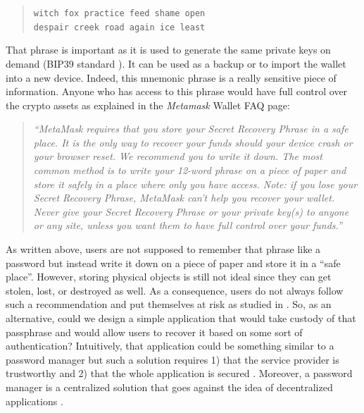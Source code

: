 \documentclass[runningheads]{llncs}
\begin{document}
\begin{quote}
\begin{center}
{\tt witch fox practice feed shame open}\\
{\tt despair creek road again ice least}
\end{center}
\end{quote}

That phrase is important as it is used to generate the same private keys on demand (BIP39 standard \cite{palatinus2013mnemonic}). It can be used as a backup or to import the wallet into a new device. Indeed, this mnemonic phrase is a really sensitive piece of information. Anyone who has access to this phrase would have full control over the crypto assets as explained in the {\em Metamask} Wallet FAQ page:

\begin{quote}
{\em ``MetaMask requires that you store your Secret Recovery Phrase in a safe place. It is the only way to recover your funds should your device crash or your browser reset. We recommend you to write it down. The most common method is to write your 12-word phrase on a piece of paper and store it safely in a place where only you have access. Note: if you lose your Secret Recovery Phrase, MetaMask can’t help you recover your wallet. Never give your Secret Recovery Phrase or your private key(s) to anyone or any site, unless you want them to have full control over your funds.''}\\
\end{quote}

As written above, users are not supposed to remember that phrase like a password but instead write it down on a piece of paper and store it in a ``safe place''. However, storing physical objects is still not ideal since they can get stolen, lost, or destroyed as well. As a consequence, users do not always follow such a recommendation and put themselves at risk as studied in \cite{voskobojnikov2021u}. So, as an alternative, could we design a simple application that would take custody of that passphrase and would allow users to recover it based on some sort of authentication? Intuitively, that application could be something similar to a password manager but such a solution requires 1) that the service provider is trustworthy and 2) that the whole application is secured \cite{li2014emperor}. Moreover, a password manager is a centralized solution that goes against the idea of decentralized applications \cite{buterin2017ethereum,cai2018decentralized}. \\
\end{document}
